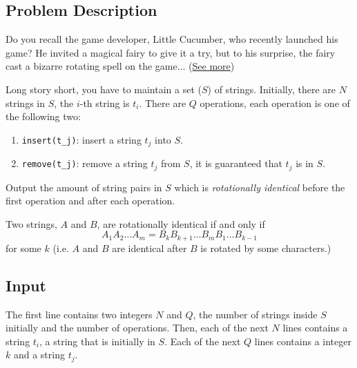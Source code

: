\providecommand{\tightlist}{\setlength{\itemsep}{0pt}\setlength{\parskip}{0pt}}
\setcounter{secnumdepth}{0}


\subsection{Problem Description}\label{problem-description}

\vspace{6pt}

Do you recall the game developer, Little Cucumber, who recently launched his game? He invited a magical fairy to give it a try, but to his surprise, the fairy cast a bizarre rotating spell on the game... (\href{https://www.youtube.com/watch?v=dQw4w9WgXcQ}{See more})

Long story short, you have to maintain a set ($S$) of strings. Initially, there are $N$ strings in $S$, the $i$-th string is $t_i$. There are $Q$ operations, each operation is one of the following two:

\begin{enumerate}
    \item \verb|insert(t_j)|: insert a string $t_j$ into $S$.
    \item \verb|remove(t_j)|: remove a string $t_j$ from $S$, it is guaranteed that $t_j$ is in $S$. 
\end{enumerate}

Output the amount of string pairs in $S$ which is \textit{rotationally identical} before the first operation and after each operation. 

Two strings, $A$ and $B$, are rotationally identical if and only if 
$$
A_1A_2\dots A_m = B_kB_{k+1}\dots B_mB_1\dots B_{k-1}
$$
for some $k$ (i.e. $A$ and $B$ are identical after $B$ is rotated by some characters.)

\subsection{Input}\label{input}

The first line contains two integers $N$ and $Q$, the number of strings inside $S$ initially and the number of operations. Then, each of the next $N$ lines contains a string $t_i$, a string that is initially in $S$. Each of the next $Q$ lines contains a integer $k$ and a string $t_j$. 


